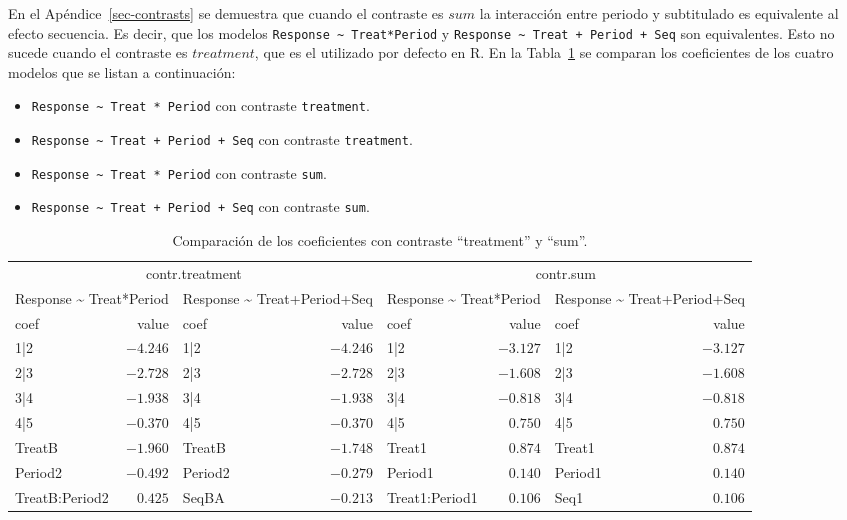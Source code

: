 \documentclass[
  12pt,
  a4paper,
  extrafontsizes,
  onecolumn,
  openright,
  table]{memoir}
\providecommand{\tightlist}{%
  \setlength{\itemsep}{0pt}\setlength{\parskip}{0pt}}\usepackage{longtable,booktabs,array}
\begin{document}
\normalsize

En el Apéndice~\ref{sec-contrasts} se demuestra que cuando el contraste
es \(sum\) la interacción entre periodo y subtitulado es equivalente al
efecto secuencia. Es decir, que los modelos
\texttt{Response\ \textasciitilde{}\ Treat*Period} y
\texttt{Response\ \textasciitilde{}\ Treat\ +\ Period\ +\ Seq} son
equivalentes. Esto no sucede cuando el contraste es \(treatment\), que
es el utilizado por defecto en R. En la Tabla~\ref{tbl-contrast} se
comparan los coeficientes de los cuatro modelos que se listan a
continuación:

\begin{itemize}
\tightlist
\item
  \texttt{Response\ \textasciitilde{}\ Treat\ *\ Period} con contraste
  \texttt{treatment}.
\item
  \texttt{Response\ \textasciitilde{}\ Treat\ +\ Period\ +\ Seq} con
  contraste \texttt{treatment}.
\item
  \texttt{Response\ \textasciitilde{}\ Treat\ *\ Period} con contraste
  \texttt{sum}.
\item
  \texttt{Response\ \textasciitilde{}\ Treat\ +\ Period\ +\ Seq} con
  contraste \texttt{sum}.
\end{itemize}

\tiny

\hypertarget{tbl-contrast}{}
\begin{longtable}{lrlrlrlr}
\caption{\label{tbl-contrast}Comparación de los coeficientes con contraste ``treatment'' y ``sum''. }\tabularnewline

\toprule
\multicolumn{4}{c}{contr.treatment} & \multicolumn{4}{c}{contr.sum} \\ 
\cmidrule(lr){1-4} \cmidrule(lr){5-8}
\multicolumn{2}{c}{Response \textasciitilde{} Treat*Period} & \multicolumn{2}{c}{Response \textasciitilde{} Treat+Period+Seq} & \multicolumn{2}{c}{Response \textasciitilde{} Treat*Period} & \multicolumn{2}{c}{Response \textasciitilde{} Treat+Period+Seq} \\ 
\cmidrule(lr){1-2} \cmidrule(lr){3-4} \cmidrule(lr){5-6} \cmidrule(lr){7-8}
coef & value & coef & value & coef & value & coef & value \\ 
\midrule
1|2 & $-4.246$ & 1|2 & $-4.246$ & 1|2 & $-3.127$ & 1|2 & $-3.127$ \\ 
2|3 & $-2.728$ & 2|3 & $-2.728$ & 2|3 & $-1.608$ & 2|3 & $-1.608$ \\ 
3|4 & $-1.938$ & 3|4 & $-1.938$ & 3|4 & $-0.818$ & 3|4 & $-0.818$ \\ 
4|5 & $-0.370$ & 4|5 & $-0.370$ & 4|5 & $0.750$ & 4|5 & $0.750$ \\ 
TreatB & $-1.960$ & TreatB & $-1.748$ & Treat1 & $0.874$ & Treat1 & $0.874$ \\ 
Period2 & $-0.492$ & Period2 & $-0.279$ & Period1 & $0.140$ & Period1 & $0.140$ \\ 
TreatB:Period2 & $0.425$ & SeqBA & $-0.213$ & Treat1:Period1 & $0.106$ & Seq1 & $0.106$ \\ 
\bottomrule
\end{longtable}
\end{document}
